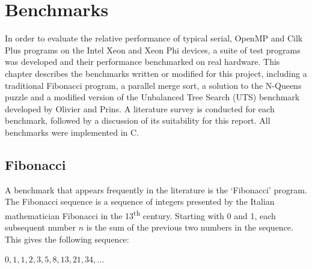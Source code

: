 \documentclass{report}
\begin{document}
\chapter{Benchmarks} \label{Sec:benchmarks}

In order to evaluate the relative performance of typical serial, OpenMP and Cilk Plus programs on the Intel Xeon and Xeon Phi devices, a suite of test programs was developed and their performance benchmarked on real hardware. This chapter describes the benchmarks written or modified for this project, including a traditional Fibonacci program, a parallel merge sort, a solution to the N-Queens puzzle and a modified version of the Unbalanced Tree Search (UTS) benchmark developed by Olivier and Prins\cite{Olivier09}. A literature survey is conducted for each benchmark, followed by a discussion of its suitability for this report. All benchmarks were implemented in C.

\section{Fibonacci} \label{Sec:fibonacci}

A benchmark that appears frequently in the literature is the `Fibonacci' program. The Fibonacci sequence is a sequence of integers presented by the Italian mathematician Fibonacci in the 13\textsuperscript{th} century. Starting with 0 and 1, each subsequent number \(n\) is the sum of the previous two numbers in the sequence. This gives the following sequence:
\begin{center}
\(0, 1, 1, 2, 3, 5, 8, 13, 21, 34, ...\)
\end{center}
\end{document}
